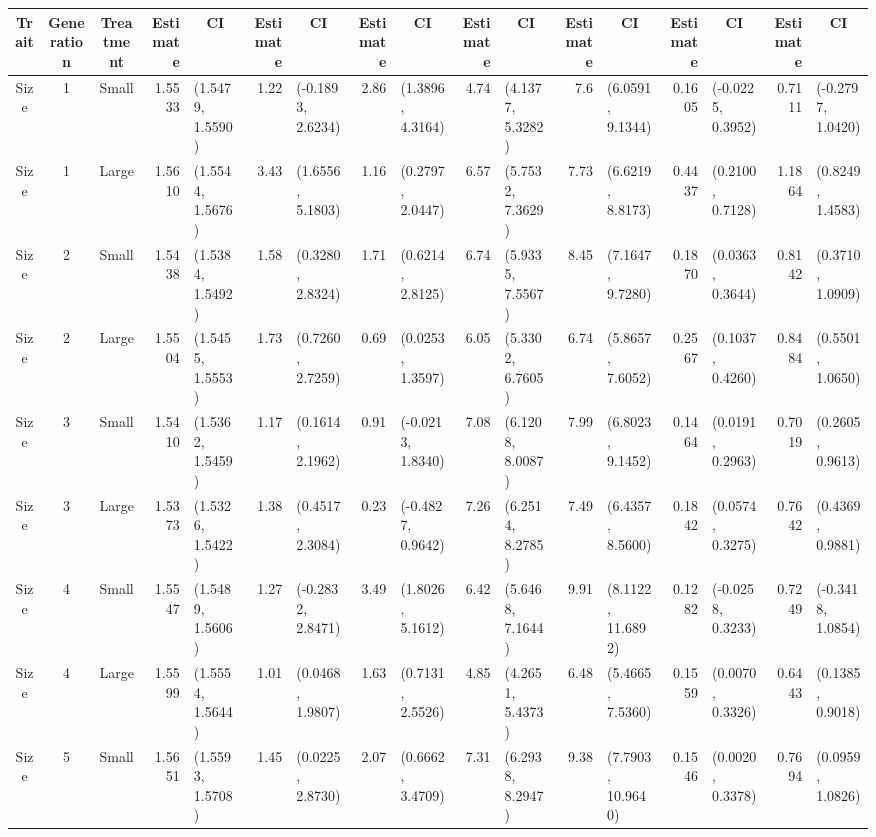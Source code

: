 \begin{landscape}
\begin{table}[!ht]
\begin{tabular}{cccrlrlrlrlrlrlrl}
    	\midrule
        Trait	&	Generation	&	Treatment	&	Estimate	&	\multicolumn{1}{c}{CI}	&	Estimate	&	\multicolumn{1}{c}{CI}	&	Estimate	&	\multicolumn{1}{c}{CI}	&	Estimate	&	\multicolumn{1}{c}{CI}	&	Estimate	&	\multicolumn{1}{c}{CI}	&	Estimate	&	\multicolumn{1}{c}{CI}	&	Estimate	&	\multicolumn{1}{c}{CI}	\\
        \midrule
        Size	&	1	&	Small	&	1.5533	&	(1.5479, 1.5590)	&	1.22	&	(-0.1893, 2.6234)	&	2.86	&	(1.3896, 4.3164)	&	4.74	&	(4.1377, 5.3282)	&	7.6	&	(6.0591, 9.1344)	&	0.1605	&	(-0.0225, 0.3952)	&	0.7111	&	(-0.2797, 1.0420)	\\
Size	&	1	&	Large	&	1.5610	&	(1.5544, 1.5676)	&	3.43	&	(1.6556, 5.1803)	&	1.16	&	(0.2797, 2.0447)	&	6.57	&	(5.7532, 7.3629)	&	7.73	&	(6.6219, 8.8173)	&	0.4437	&	(0.2100, 0.7128)	&	1.1864	&	(0.8249, 1.4583)	\\
Size	&	2	&	Small	&	1.5438	&	(1.5384, 1.5492)	&	1.58	&	(0.3280, 2.8324)	&	1.71	&	(0.6214, 2.8125)	&	6.74	&	(5.9335, 7.5567)	&	8.45	&	(7.1647, 9.7280)	&	0.1870	&	(0.0363, 0.3644)	&	0.8142	&	(0.3710, 1.0909)	\\
Size	&	2	&	Large	&	1.5504	&	(1.5455, 1.5553)	&	1.73	&	(0.7260, 2.7259)	&	0.69	&	(0.0253, 1.3597)	&	6.05	&	(5.3302, 6.7605)	&	6.74	&	(5.8657, 7.6052)	&	0.2567	&	(0.1037, 0.4260)	&	0.8484	&	(0.5501, 1.0650)	\\
Size	&	3	&	Small	&	1.5410	&	(1.5362, 1.5459)	&	1.17	&	(0.1614, 2.1962)	&	0.91	&	(-0.0213, 1.8340)	&	7.08	&	(6.1208, 8.0087)	&	7.99	&	(6.8023, 9.1452)	&	0.1464	&	(0.0191, 0.2963)	&	0.7019	&	(0.2605, 0.9613)	\\
Size	&	3	&	Large	&	1.5373	&	(1.5326, 1.5422)	&	1.38	&	(0.4517, 2.3084)	&	0.23	&	(-0.4827, 0.9642)	&	7.26	&	(6.2514, 8.2785)	&	7.49	&	(6.4357, 8.5600)	&	0.1842	&	(0.0574, 0.3275)	&	0.7642	&	(0.4369, 0.9881)	\\
Size	&	4	&	Small	&	1.5547	&	(1.5489, 1.5606)	&	1.27	&	(-0.2832, 2.8471)	&	3.49	&	(1.8026, 5.1612)	&	6.42	&	(5.6468, 7.1644)	&	9.91	&	(8.1122, 11.6892)	&	0.1282	&	(-0.0258, 0.3233)	&	0.7249	&	(-0.3418, 1.0854)	\\
Size	&	4	&	Large	&	1.5599	&	(1.5554, 1.5644)	&	1.01	&	(0.0468, 1.9807)	&	1.63	&	(0.7131, 2.5526)	&	4.85	&	(4.2651, 5.4373)	&	6.48	&	(5.4665, 7.5360)	&	0.1559	&	(0.0070, 0.3326)	&	0.6443	&	(0.1385, 0.9018)	\\
Size	&	5	&	Small	&	1.5651	&	(1.5593, 1.5708)	&	1.45	&	(0.0225, 2.8730)	&	2.07	&	(0.6662, 3.4709)	&	7.31	&	(6.2938, 8.2947)	&	9.38	&	(7.7903, 10.9640)	&	0.1546	&	(0.0020, 0.3378)	&	0.7694	&	(0.0959, 1.0826)	\\

\end{tabular}
\end{table}
\end{landscape}
